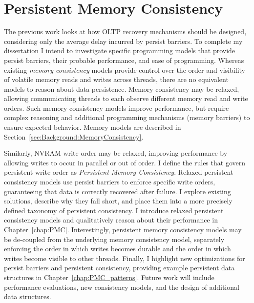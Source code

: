 \section{Persistent Memory Consistency}
\label{sec:Intro:PMC}

The previous work looks at how OLTP recovery mechanisms should be designed, considering only the average delay incurred by persist barriers.
To complete my dissertation I intend to investigate specific programming models that provide persist barriers, their probable performance, and ease of programming.
Whereas existing \emph{memory consistency} models provide control over the order and visibility of volatile memory reads and writes across threads, there are no equivalent models to reason about data persistence.
Memory consistency may be relaxed, allowing communicating threads to each observe different memory read and write orders.
Such memory consistency models improve performance, but require complex reasoning and additional programming mechanisms (memory barriers) to ensure expected behavior.
Memory models are described in Section~\ref{sec:Background:MemoryConsistency}.

Similarly, NVRAM write order may be relaxed, improving performance by allowing writes to occur in parallel or out of order.
I define the rules that govern persistent write order as \emph{Persistent Memory Consistency}.
Relaxed persistent consistency models use persist barriers to enforce specific write orders, guaranteeing that data is correctly recovered after failure.
I explore existing solutions, describe why they fall short, and place them into a more precisely defined taxonomy of persistent consistency.
I introduce relaxed persistent consistency models and qualitatively reason about their performance in Chapter~\ref{chap:PMC}.
Interestingly, persistent memory consistency models may be de-coupled from the underlying memory consistency model, separately enforcing the order in which writes becomes durable and the order in which writes become visible to other threads.
Finally, I highlight new optimizations for persist barriers and persistent consistency, providing example persistent data structures in Chapter~\ref{chap:PMC_patterns}.
Future work will include performance evaluations, new consistency models, and the design of additional data structures.

